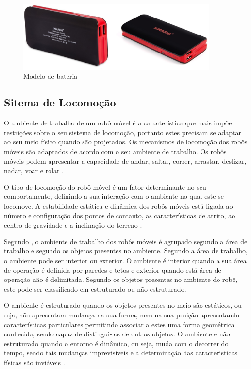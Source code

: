 \begin{figure}[H]
    \centering
    \includegraphics[width=0.9\textwidth]{figuras/baterias.eps}
    \caption{Modelo de bateria}
    \label{fig:bateria}
\end{figure}

\subsection{Sitema de Locomoção}

O ambiente de trabalho de um robô móvel é a característica que mais impõe restrições sobre o seu sistema de locomoção, portanto estes
precisam se adaptar ao seu meio físico quando são projetados. Os mecanismos de locomoção dos robôs móveis são adaptados de acordo com
o seu ambiente de trabalho. Os robôs móveis podem apresentar a capacidade de andar, saltar, correr, arrastar, deslizar, nadar, voar
e rolar \cite{secchi:2008}.

O tipo de locomoção do robô móvel é um fator determinante no seu comportamento, definindo a sua interação com o ambiente no qual
este se locomove. A estabilidade estática e dinâmica dos robôs móveis está ligada ao número e configuração dos pontos de contanto,
as características de atrito, ao centro de gravidade e a inclinação do terreno \cite{silva:2010}.

Segundo , o ambiente de trabalho dos robôs móveis é agrupado segundo a área de trabalho e segundo os objetos
presentes no ambiente. Segundo a área de trabalho, o ambiente pode ser interior ou exterior. O ambiente é interior quando a sua
área de operação é definida por paredes e tetos e exterior quando está área de operação não é delimitada. Segundo os objetos
presentes no ambiente do robô, este pode ser classificado em estruturado ou não estruturado.

O ambiente é estruturado quando os objetos presentes no meio são estáticos, ou seja, não apresentam mudança na sua forma, nem na
sua posição apresentando características particulares permitindo associar a estes uma forma geométrica conhecida, sendo capaz de
distingui-los de outros objetos. O ambiente e não estruturado quando o entorno é dinâmico, ou seja, muda com o decorrer do
tempo, sendo tais mudanças imprevisíveis e a determinação das características físicas são inviáveis \cite{secchi:2008}.


